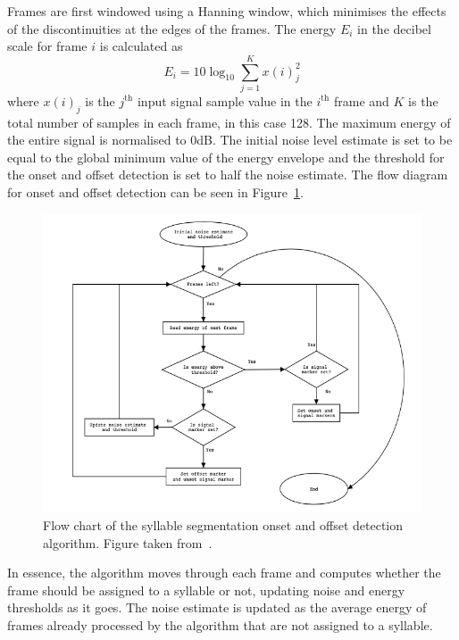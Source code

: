 Frames are first windowed using a Hanning window, which minimises the effects of
the discontinuities at the edges of the frames. The energy $E_i$ in the
decibel scale for frame $i$ is calculated as
\begin{equation}
  E_i = 10 \log_{10} \sum_{j=1}^{K} x{(i)}_{j}^2
\end{equation}
where $x{(i)}_j$ is the $j^{\text{th}}$ input signal sample value in the
$i^{\text{th}}$ frame and $K$ is the total number of samples in each frame, in
this case 128. The maximum energy of the entire signal is normalised to 0dB. The
initial noise level estimate is set to be equal to the global minimum value of the
energy envelope and the threshold for the onset and offset detection is set to
half the noise estimate. The flow diagram for onset and offset detection can be
seen in Figure~\ref{fig:syllable_segmentation_flow}. 

\begin{figure}[ht]
  \centering
  \includegraphics[width=\textwidth]{figures/syllable_segmentation_flow.png}
  \caption{Flow chart of the syllable segmentation onset and offset detection
  algorithm. Figure taken
from~\cite{fagerlund2004automatic}.}\label{fig:syllable_segmentation_flow}
\end{figure}

In essence, the algorithm moves through each frame and computes whether the
frame should be assigned to a syllable or not, updating noise and energy
thresholds as it goes. The noise estimate is updated as the average energy of
frames already processed by the algorithm that are not assigned to a syllable.

